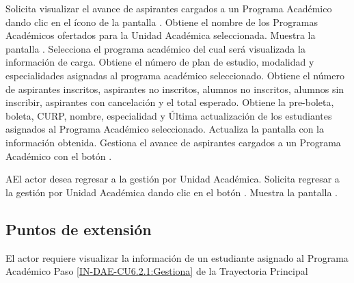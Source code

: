 \begin{UCtrayectoria}
	\UCpaso [\UCactor] Solicita visualizar el avance de aspirantes cargados a un Programa Académico dando clic en el ícono \IUVer{} de la pantalla .
	\UCpaso Obtiene el nombre de los Programas Académicos ofertados para la Unidad Académica seleccionada.
	\UCpaso Muestra la pantalla .
	\UCpaso [\UCactor] Selecciona el programa académico del cual será visualizada la información de carga.
	\UCpaso \label{IN-DES-CU6.2.1:Obtiene} Obtiene el número de plan de estudio, modalidad y especialidades asignadas al programa académico seleccionado.
	\UCpaso Obtiene el número de aspirantes inscritos, aspirantes no inscritos, alumnos no inscritos, alumnos sin inscribir, aspirantes con cancelación y el total esperado.
	\UCpaso Obtiene la pre-boleta, boleta, CURP, nombre, especialidad y Última actualización de los estudiantes asignados al Programa Académico seleccionado.
	\UCpaso \label{IN-DAE-CU6.2.1:Gestiona} Actualiza la pantalla  con la información obtenida.
	\UCpaso [\UCactor] Gestiona el avance de aspirantes cargados a un Programa Académico con el botón \IUVer. 
\end{UCtrayectoria}

\begin{UCtrayectoriaA}{A}{El actor desea regresar a la gestión por Unidad Académica.}
	\UCpaso [\UCactor] Solicita regresar a la gestión por Unidad Académica dando clic en el botón .
	\UCpaso Muestra la pantalla .
\end{UCtrayectoriaA}

\subsection{Puntos de extensión}

{El actor requiere visualizar la información de un estudiante asignado al Programa Académico}
{Paso \ref{IN-DAE-CU6.2.1:Gestiona} de la Trayectoria Principal}
{}

